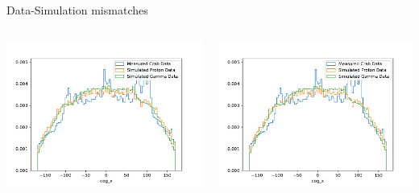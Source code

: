 \begin{frame}[t]{Data-Simulation mismatches}
\begin{columns}[onlytextwidth]
    \begin{column}{0.475\textwidth}
        \includegraphics[width=1.1\textwidth,page=12]{fig/gpd_mc_comp_cuts_nc.pdf}
    \end{column}
    \begin{column}{0.475\textwidth}
        \includegraphics[width=1.1\textwidth,page=10]{fig/gpd_mc_comp_cuts_nc.pdf}
    \end{column}
\end{columns}
\end{frame}

